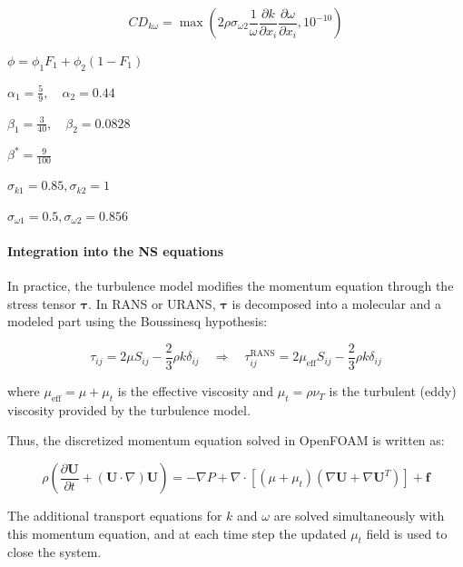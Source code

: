 \begin{equation}
    CD_{k\omega} = \max \left( 2\rho \sigma_{\omega 2} \frac{1}{\omega} \frac{\partial k}{\partial x_i} \frac{\partial \omega}{\partial x_i}, 10^{-10} \right)
\end{equation}

$\phi = \phi_1 F_1 + \phi_2 (1 - F_1)$

$\alpha_1 = \frac{5}{9}, \quad \alpha_2 = 0.44$

$\beta_1 = \frac{3}{40}, \quad \beta_2 = 0.0828$

$\beta^* = \frac{9}{100}$

$\sigma_{k1}  = 0.85,  \sigma_{k2}  = 1$

$\sigma_{\omega 1}  = 0.5,  \sigma_{\omega 2}  = 0.856$


\paragraph{Integration into the NS equations}

In practice, the turbulence model modifies the momentum equation through the stress tensor $\boldsymbol{\tau}$.  
In RANS or URANS, $\boldsymbol{\tau}$ is decomposed into a molecular and a modeled part using the Boussinesq hypothesis:

\begin{equation}
    \tau_{ij} = 2 \mu S_{ij} - \frac{2}{3} \rho k \delta_{ij}
              \quad \Rightarrow \quad
              \tau_{ij}^{\text{RANS}} = 2 \mu_{\text{eff}} S_{ij} - \frac{2}{3} \rho k \delta_{ij}
\end{equation}

where $\mu_{\text{eff}} = \mu + \mu_t$ is the effective viscosity and $\mu_t = \rho \nu_T$ is the turbulent (eddy) viscosity provided by the turbulence model.  

Thus, the discretized momentum equation solved in OpenFOAM is written as:

\begin{equation}
    \rho \left( \frac{\partial \mathbf{U}}{\partial t} + (\mathbf{U}\cdot\nabla)\mathbf{U} \right)
    = - \nabla P + \nabla \cdot \left[ (\mu + \mu_t) \left( \nabla \mathbf{U} + \nabla \mathbf{U}^T \right) \right] + \mathbf{f}
\end{equation}

The additional transport equations for $k$ and $\omega$ are solved simultaneously with this momentum equation, and at each time step the updated $\mu_t$ field is used to close the system.

